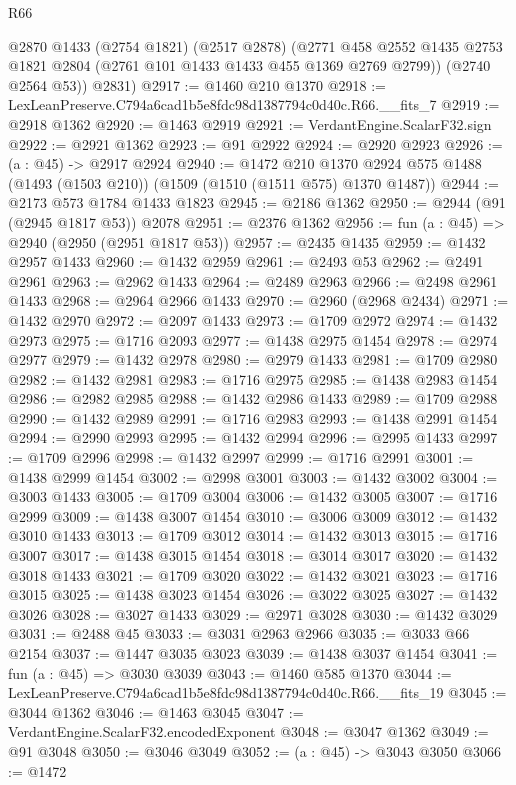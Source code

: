 \begin{lexlean}{R66}
\begin{coremodule}
        @2870
        @1433
        (@2754 @1821)
        (@2517 @2878)
        (@2771 @458 @2552 @1435 @2753 @1821 @2804 (@2761 @101 @1433 @1433 @455 @1369 @2769 @2799))
        (@2740 @2564 @53))
      @2831)
@2917 := @1460 @210 @1370
@2918 := LexLeanPreserve.C794a6cad1b5e8fdc98d1387794c0d40c.R66.__fits_7
@2919 := @2918 @1362
@2920 := @1463 @2919
@2921 := VerdantEngine.ScalarF32.sign
@2922 := @2921 @1362
@2923 := @91 @2922
@2924 := @2920 @2923
@2926 := (a : @45) -> @2917 @2924
@2940 := @1472
    @210
    @1370
    @2924
    @575
    @1488
    (@1493 (@1503 @210))
    (@1509 (@1510 (@1511 @575) @1370 @1487))
@2944 := @2173 @573 @1784 @1433 @1823
@2945 := @2186 @1362
@2950 := @2944 (@91 (@2945 @1817 @53)) @2078
@2951 := @2376 @1362
@2956 := fun (a : @45) => @2940 (@2950 (@2951 @1817 @53))
@2957 := @2435 @1435
@2959 := @1432 @2957 @1433
@2960 := @1432 @2959
@2961 := @2493 @53
@2962 := @2491 @2961
@2963 := @2962 @1433
@2964 := @2489 @2963
@2966 := @2498 @2961 @1433
@2968 := @2964 @2966 @1433
@2970 := @2960 (@2968 @2434)
@2971 := @1432 @2970
@2972 := @2097 @1433
@2973 := @1709 @2972
@2974 := @1432 @2973
@2975 := @1716 @2093
@2977 := @1438 @2975 @1454
@2978 := @2974 @2977
@2979 := @1432 @2978
@2980 := @2979 @1433
@2981 := @1709 @2980
@2982 := @1432 @2981
@2983 := @1716 @2975
@2985 := @1438 @2983 @1454
@2986 := @2982 @2985
@2988 := @1432 @2986 @1433
@2989 := @1709 @2988
@2990 := @1432 @2989
@2991 := @1716 @2983
@2993 := @1438 @2991 @1454
@2994 := @2990 @2993
@2995 := @1432 @2994
@2996 := @2995 @1433
@2997 := @1709 @2996
@2998 := @1432 @2997
@2999 := @1716 @2991
@3001 := @1438 @2999 @1454
@3002 := @2998 @3001
@3003 := @1432 @3002
@3004 := @3003 @1433
@3005 := @1709 @3004
@3006 := @1432 @3005
@3007 := @1716 @2999
@3009 := @1438 @3007 @1454
@3010 := @3006 @3009
@3012 := @1432 @3010 @1433
@3013 := @1709 @3012
@3014 := @1432 @3013
@3015 := @1716 @3007
@3017 := @1438 @3015 @1454
@3018 := @3014 @3017
@3020 := @1432 @3018 @1433
@3021 := @1709 @3020
@3022 := @1432 @3021
@3023 := @1716 @3015
@3025 := @1438 @3023 @1454
@3026 := @3022 @3025
@3027 := @1432 @3026
@3028 := @3027 @1433
@3029 := @2971 @3028
@3030 := @1432 @3029
@3031 := @2488 @45
@3033 := @3031 @2963 @2966
@3035 := @3033 @66 @2154
@3037 := @1447 @3035 @3023
@3039 := @1438 @3037 @1454
@3041 := fun (a : @45) => @3030 @3039
@3043 := @1460 @585 @1370
@3044 := LexLeanPreserve.C794a6cad1b5e8fdc98d1387794c0d40c.R66.__fits_19
@3045 := @3044 @1362
@3046 := @1463 @3045
@3047 := VerdantEngine.ScalarF32.encodedExponent
@3048 := @3047 @1362
@3049 := @91 @3048
@3050 := @3046 @3049
@3052 := (a : @45) -> @3043 @3050
@3066 := @1472

\end{coremodule}
\end{lexlean}
